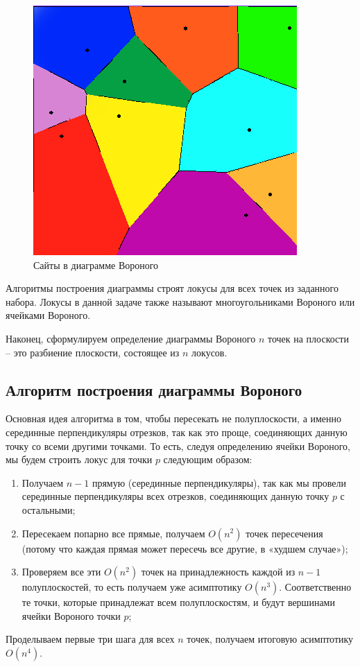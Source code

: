 \begin{figure}[h]
	\centering\includegraphics[width=0.4\linewidth]{img/sites}
	\caption{Сайты в диаграмме Вороного}
	\label{fig:sites}
\end{figure}

Алгоритмы построения диаграммы строят локусы для всех точек из заданного набора. Локусы в данной задаче также называют многоугольниками Вороного или ячейками Вороного. 

Наконец, сформулируем определение диаграммы Вороного $n$ точек на плоскости -- это разбиение плоскости, состоящее из $n$ локусов. 

\subsection{Алгоритм построения диаграммы Вороного}
Основная идея алгоритма в том, чтобы пересекать не полуплоскости, а именно серединные перпендикуляры отрезков, так как это проще, соединяющих данную точку со всеми другими точками. То есть, следуя определению ячейки Вороного, мы будем строить локус для точки $p$ следующим образом:

\begin{enumerate}
	\item Получаем $n-1$ прямую (серединные перпендикуляры), так как мы провели серединные перпендикуляры всех отрезков, соединяющих данную точку $p$ с остальными;
	\item Пересекаем попарно все прямые, получаем $O(n^2)$ точек пересечения (потому что каждая прямая может пересечь все другие, в «худшем случае»);
	\item Проверяем все эти $O(n^2)$ точек на принадлежность каждой из $n-1$ полуплоскостей, то есть получаем уже асимптотику $O(n^3)$. Соответственно те точки, которые принадлежат всем полуплоскостям, и будут вершинами ячейки Вороного точки $p$;
\end{enumerate}

Проделываем первые три шага для всех $n$ точек, получаем итоговую асимптотику $O(n^4)$.

\newpage
